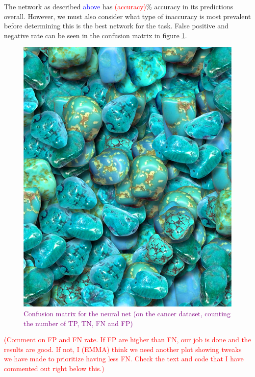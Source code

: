 The network as described \textcolor{blue}{above} has \textcolor{red}{(accuracy)}\% accuracy in its predictions overall. However, we must also consider what type of inaccuracy is most prevalent before determining this is the best network for the task. False positive and negative rate can be seen in the confusion matrix in figure \ref{fig:confusionmatrix}.
\begin{figure}
    \centering
    \includegraphics[width=\linewidth]{figures/placeholders/confusionmatrix.png}
    \caption{\textcolor{purple}{Confusion matrix for the neural net (on the cancer dataset, counting the number of TP, TN, FN and FP)}}
    \label{fig:confusionmatrix}
\end{figure}


\textcolor{red}{(Comment on FP and FN rate. If FP are higher than FN, our job is done and the results are good. If not, I (EMMA) think we need another plot showing tweaks we have made to prioritize having less FN. Check the text and code that I have commented out right below this.)}


